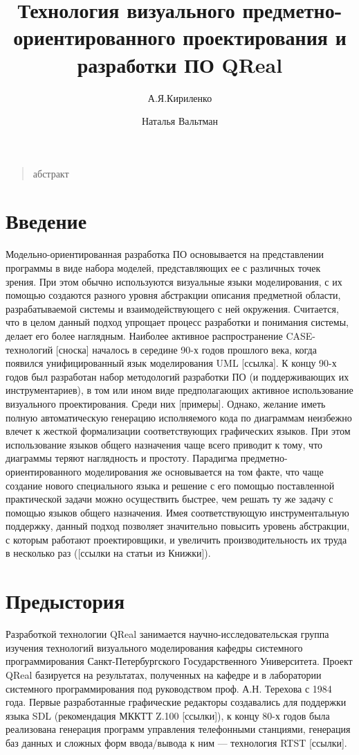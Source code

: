 \documentclass[a5paper]{article}
\title{Технология визуального предметно-ориентированного проектирования и разработки ПО QReal}
\author{А.Я.Кириленко \and Наталья Вальтман}
\date{}
\begin{document}
\maketitle
\thispagestyle{empty}

\begin{quote}
\small\noindent
абстракт
\end{quote}

\section*{Введение}

Модельно-ориентированная разработка ПО основывается на представлении программы в виде набора моделей, представляющих ее с различных точек зрения. При этом обычно используются визуальные языки моделирования, с их помощью создаются разного уровня абстракции описания предметной области, разрабатываемой системы и взаимодействующего с ней окружения. Считается, что в целом данный подход упрощает процесс разработки и понимания системы, делает его более наглядным. Наиболее активное распространение CASE-технологий [сноска] началось в середине 90-х годов прошлого века, когда появился унифицированный язык моделирования UML [ссылка]. К концу 90-х годов был разработан набор методологий разработки ПО (и поддерживающих их инструментариев), в том или ином виде предполагающих активное использование визуального проектирования. Среди них [примеры]. Однако, желание иметь полную автоматическую генерацию исполняемого кода по диаграммам неизбежно влечет к жесткой формализации соответствующих графических языков. При этом использование языков общего назначения чаще всего приводит к тому, что диаграммы теряют наглядность и простоту. Парадигма предметно-ориентированного моделирования же основывается на том факте, что чаще создание нового специального языка и решение с его помощью поставленной практической задачи можно осуществить быстрее, чем решать ту же задачу с помощью языков общего назначения. Имея соответствующую инструментальную поддержку, данный подход позволяет значительно повысить уровень абстракции, с которым работают проектировщики, и увеличить производительность их труда в несколько раз ([ссылки на статьи из Книжки]).

\section{Предыстория}

Разработкой технологии QReal занимается научно-исследовательская группа изучения технологий визуального моделирования кафедры системного программирования Санкт-Петербургского Государственного Университета. Проект QReal базируется на результатах, полученных на кафедре и в лаборатории системного программирования под руководством проф. А.Н. Терехова с 1984 года. Первые разработанные графические редакторы создавались для поддержки языка SDL (рекомендация МККТТ Z.100 [ссылки]), к концу 80-х годов была реализована генерация программ управления телефонными станциями, генерация баз данных и сложных форм ввода/вывода к ним — технология RTST [ссылки]. 
\end{document}
